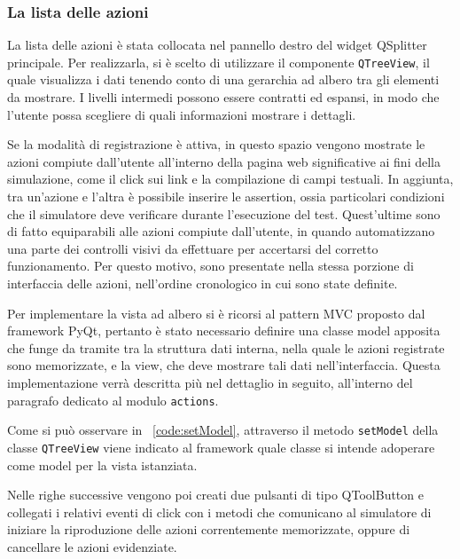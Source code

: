\subsubsection{La lista delle azioni}

La lista delle azioni è stata collocata nel pannello destro del widget QSplitter principale. Per realizzarla, si è scelto di utilizzare il componente \verb|QTreeView|, il quale visualizza i dati tenendo conto di una gerarchia ad albero tra gli elementi da mostrare. I livelli intermedi possono essere contratti ed espansi, in modo che l'utente possa scegliere di quali informazioni mostrare i dettagli. 

Se la modalità di registrazione è attiva, in questo spazio vengono mostrate le azioni compiute dall'utente all'interno della pagina web significative ai fini della simulazione, come il click sui link e la compilazione di campi testuali. In aggiunta, tra un'azione e l'altra è possibile inserire le assertion, ossia particolari condizioni che il simulatore deve verificare durante l'esecuzione del test. Quest'ultime sono di fatto equiparabili alle azioni compiute dall'utente, in quando automatizzano una parte dei controlli visivi da effettuare per accertarsi del corretto funzionamento. Per questo motivo, sono presentate nella stessa porzione di interfaccia delle azioni, nell'ordine cronologico in cui sono state definite.

Per implementare la vista ad albero si è ricorsi al pattern MVC proposto dal framework PyQt, pertanto è stato necessario definire una classe model apposita che funge da tramite tra la struttura dati interna, nella quale le azioni registrate sono memorizzate, e la view, che deve mostrare tali dati nell'interfaccia. Questa implementazione verrà descritta più nel dettaglio in seguito, all'interno del paragrafo dedicato al modulo \verb|actions|.



Come si può osservare in ~\ref{code:setModel}, attraverso il metodo \verb|setModel| della classe \verb|QTreeView| viene indicato al framework quale classe si intende adoperare come model per la vista istanziata.

Nelle righe successive vengono poi creati due pulsanti di tipo QToolButton e collegati i relativi eventi di click con i metodi che comunicano al simulatore di iniziare la riproduzione delle azioni correntemente memorizzate, oppure di cancellare le azioni evidenziate.

